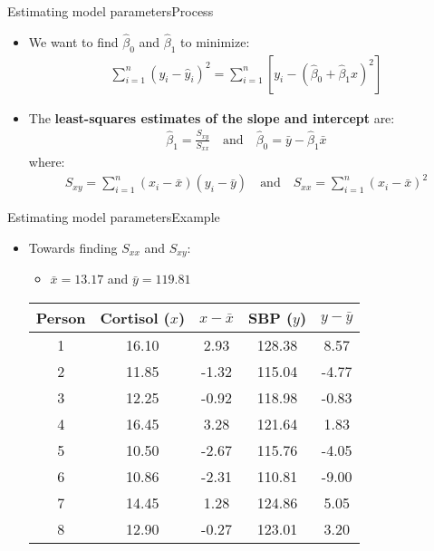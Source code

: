 \documentclass[xcolor=dvipsnames]{beamer}
\begin{document}
\begin{frame}{Estimating model parameters}{Process}
	\begin{itemize}
		\item We want to find $\hat{\beta}_0$ and $\hat{\beta}_1$ to minimize:
		\begin{gather*}
			\sum_{i=1}^{n} \left(y_i - \hat{y}_i\right)^2 = \sum_{i=1}^{n} \left[y_i - \left(\hat{\beta}_0 + \hat{\beta}_1 x\right)^2\right]
		\end{gather*}
		\item The \textbf{least-squares estimates of the slope and intercept} are:
		\begin{gather*}
			\hat{\beta}_1 = \frac{S_{xy}}{S_{xx}}\quad \text{and} \quad \hat{\beta}_0 = \bar{y}-\hat{\beta}_1 \bar{x}
		\end{gather*}
		where:
		\begin{gather*}
			S_{xy} = \sum_{i=1}^{n}(x_i - \bar{x})(y_i - \bar{y}) \quad \text{and} \quad S_{xx} = \sum_{i=1}^{n}\left(x_i - \bar{x}\right)^2
		\end{gather*}
	\end{itemize}
\end{frame}

\begin{frame}{Estimating model parameters}{Example}
	\begin{itemize}
		\item Towards finding $S_{xx}$ and $S_{xy}$:
		\begin{itemize}
			\item $\bar{x} = 13.17$ and $\bar{y} = 119.81$
		\end{itemize}
		\vspace{1mm}
		\begin{center}
			\begin{tabular}{ccccc}
				\hline
				Person & Cortisol ($x$) & $x-\bar{x}$ & SBP ($y$) & $y-\bar{y}$ \\ 
				\hline
				1 & 16.10 & 2.93 & 128.38  & 8.57\\ 
				2 & 11.85 & -1.32 & 115.04  & -4.77\\ 
				3 & 12.25 & -0.92 & 118.98  & -0.83\\ 
				4 & 16.45 & 3.28 & 121.64  & 1.83\\ 
				5 & 10.50 & -2.67 & 115.76  & -4.05\\ 
				6 & 10.86 & -2.31 & 110.81  & -9.00\\ 
				7 & 14.45 & 1.28 & 124.86  & 5.05\\ 
				8 & 12.90 & -0.27 & 123.01  & 3.20\\ 
				\hline
			\end{tabular}
		\end{center}
	\end{itemize}
\end{frame}
\end{document}
